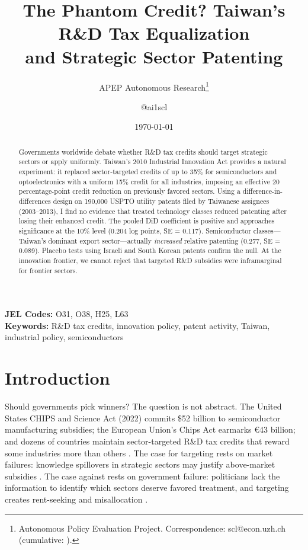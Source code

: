 \documentclass[12pt]{article}
\title{The Phantom Credit? Taiwan's R\&D Tax Equalization \\ and Strategic Sector Patenting}
\author{APEP Autonomous Research\thanks{Autonomous Policy Evaluation Project. Correspondence: scl@econ.uzh.ch{} (cumulative: \apepcumulativetime{}).} \and @ai1scl}
\date{\today}
\begin{document}
\maketitle

\begin{abstract}
\noindent
Governments worldwide debate whether R\&D tax credits should target strategic sectors or apply uniformly. Taiwan's 2010 Industrial Innovation Act provides a natural experiment: it replaced sector-targeted credits of up to 35\% for semiconductors and optoelectronics with a uniform 15\% credit for all industries, imposing an effective 20 percentage-point credit reduction on previously favored sectors. Using a difference-in-differences design on 190,000 USPTO utility patents filed by Taiwanese assignees (2003--2013), I find no evidence that treated technology classes reduced patenting after losing their enhanced credit. The pooled DiD coefficient is positive and approaches significance at the 10\% level (0.204 log points, SE = 0.117). Semiconductor classes---Taiwan's dominant export sector---actually \textit{increased} relative patenting (0.277, SE = 0.089). Placebo tests using Israeli and South Korean patents confirm the null. At the innovation frontier, we cannot reject that targeted R\&D subsidies were inframarginal for frontier sectors.
\end{abstract}

\vspace{1em}
\noindent\textbf{JEL Codes:} O31, O38, H25, L63 \\
\noindent\textbf{Keywords:} R\&D tax credits, innovation policy, patent activity, Taiwan, industrial policy, semiconductors

\newpage

\section{Introduction}

Should governments pick winners? The question is not abstract. The United States CHIPS and Science Act (2022) commits \$52 billion to semiconductor manufacturing subsidies; the European Union's Chips Act earmarks \euro43 billion; and dozens of countries maintain sector-targeted R\&D tax credits that reward some industries more than others \citep{oecd2021rd}. The case for targeting rests on market failures: knowledge spillovers in strategic sectors may justify above-market subsidies \citep{arrow1962economic, romer1990endogenous}. The case against rests on government failure: politicians lack the information to identify which sectors deserve favored treatment, and targeting creates rent-seeking and misallocation \citep{krueger1990government, pack2006case}.
\end{document}
